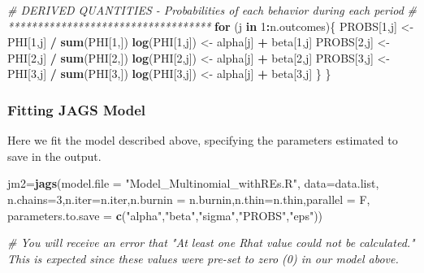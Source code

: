 \documentclass[]{article}
\newenvironment{Shaded}{\begin{snugshade}}{\end{snugshade}}
\newcommand{\CommentTok}[1]{\textcolor[rgb]{0.56,0.35,0.01}{\textit{#1}}}
\newcommand{\ControlFlowTok}[1]{\textcolor[rgb]{0.13,0.29,0.53}{\textbf{#1}}}
\newcommand{\DataTypeTok}[1]{\textcolor[rgb]{0.13,0.29,0.53}{#1}}
\newcommand{\DecValTok}[1]{\textcolor[rgb]{0.00,0.00,0.81}{#1}}
\newcommand{\KeywordTok}[1]{\textcolor[rgb]{0.13,0.29,0.53}{\textbf{#1}}}
\newcommand{\NormalTok}[1]{#1}
\newcommand{\OperatorTok}[1]{\textcolor[rgb]{0.81,0.36,0.00}{\textbf{#1}}}
\newcommand{\StringTok}[1]{\textcolor[rgb]{0.31,0.60,0.02}{#1}}
\begin{document}
\begin{Shaded}
\begin{Highlighting}[]
  \CommentTok{# DERIVED QUANTITIES - Probabilities of each behavior during each period}
  \CommentTok{# ***********************************}
  \ControlFlowTok{for}\NormalTok{ (j }\ControlFlowTok{in} \DecValTok{1}\OperatorTok{:}\NormalTok{n.outcomes)\{}
\NormalTok{    PROBS[}\DecValTok{1}\NormalTok{,j] <-}\StringTok{ }\NormalTok{PHI[}\DecValTok{1}\NormalTok{,j] }\OperatorTok{/}\StringTok{ }\KeywordTok{sum}\NormalTok{(PHI[}\DecValTok{1}\NormalTok{,])}
    \KeywordTok{log}\NormalTok{(PHI[}\DecValTok{1}\NormalTok{,j]) <-}\StringTok{ }\NormalTok{alpha[j] }\OperatorTok{+}\StringTok{ }\NormalTok{beta[}\DecValTok{1}\NormalTok{,j]}
\NormalTok{    PROBS[}\DecValTok{2}\NormalTok{,j] <-}\StringTok{ }\NormalTok{PHI[}\DecValTok{2}\NormalTok{,j] }\OperatorTok{/}\StringTok{ }\KeywordTok{sum}\NormalTok{(PHI[}\DecValTok{2}\NormalTok{,])}
    \KeywordTok{log}\NormalTok{(PHI[}\DecValTok{2}\NormalTok{,j]) <-}\StringTok{ }\NormalTok{alpha[j] }\OperatorTok{+}\StringTok{ }\NormalTok{beta[}\DecValTok{2}\NormalTok{,j]}
\NormalTok{    PROBS[}\DecValTok{3}\NormalTok{,j] <-}\StringTok{ }\NormalTok{PHI[}\DecValTok{3}\NormalTok{,j] }\OperatorTok{/}\StringTok{ }\KeywordTok{sum}\NormalTok{(PHI[}\DecValTok{3}\NormalTok{,])}
    \KeywordTok{log}\NormalTok{(PHI[}\DecValTok{3}\NormalTok{,j]) <-}\StringTok{ }\NormalTok{alpha[j] }\OperatorTok{+}\StringTok{ }\NormalTok{beta[}\DecValTok{3}\NormalTok{,j]}
\NormalTok{  \}}
\NormalTok{\}}
\end{Highlighting}
\end{Shaded}

\hypertarget{fitting-jags-model}{%
\subsubsection{Fitting JAGS Model}\label{fitting-jags-model}}

Here we fit the model described above, specifying the parameters
estimated to save in the output.

\begin{Shaded}
\begin{Highlighting}[]
\NormalTok{jm2=}\KeywordTok{jags}\NormalTok{(}\DataTypeTok{model.file =} \StringTok{"Model_Multinomial_withREs.R"}\NormalTok{,}
         \DataTypeTok{data=}\NormalTok{data.list,}
         \DataTypeTok{n.chains=}\DecValTok{3}\NormalTok{,}\DataTypeTok{n.iter=}\NormalTok{n.iter,}\DataTypeTok{n.burnin =}\NormalTok{ n.burnin,}\DataTypeTok{n.thin=}\NormalTok{n.thin,}\DataTypeTok{parallel =}\NormalTok{ F,}
         \DataTypeTok{parameters.to.save =} \KeywordTok{c}\NormalTok{(}\StringTok{"alpha"}\NormalTok{,}\StringTok{"beta"}\NormalTok{,}\StringTok{"sigma"}\NormalTok{,}\StringTok{"PROBS"}\NormalTok{,}\StringTok{"eps"}\NormalTok{))}

\CommentTok{# You will receive an error that "At least one Rhat value could not be calculated."  This is expected since these values were pre-set to zero (0) in our model above.}
\end{Highlighting}
\end{Shaded}
\end{document}
